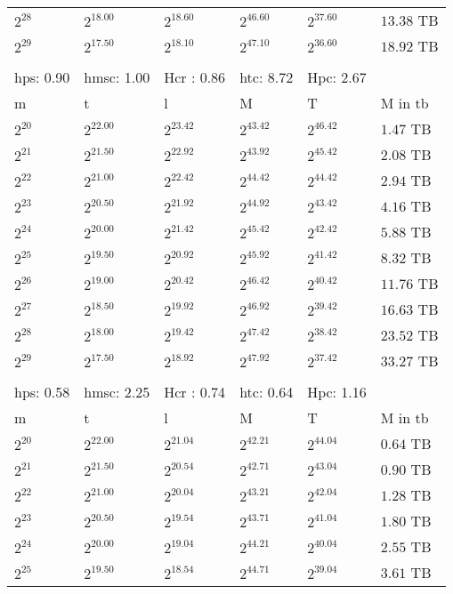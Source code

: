 \begin{tabular}{llllll}
$2^{28}$ & $2^{18.00}$ & $2^{18.60}$ & $2^{46.60}$ & $2^{37.60}$ & $13.38$ TB \\
$2^{29}$ & $2^{17.50}$ & $2^{18.10}$ & $2^{47.10}$ & $2^{36.60}$ & $18.92$ TB \\
 &  &  &  &  &  \\
hps: 0.90 & hmsc: 1.00 & Hcr : 0.86 & htc: 8.72 & Hpc: 2.67 &  \\
m & t & l & M & T & M in tb \\
$2^{20}$ & $2^{22.00}$ & $2^{23.42}$ & $2^{43.42}$ & $2^{46.42}$ & $1.47$ TB \\
$2^{21}$ & $2^{21.50}$ & $2^{22.92}$ & $2^{43.92}$ & $2^{45.42}$ & $2.08$ TB \\
$2^{22}$ & $2^{21.00}$ & $2^{22.42}$ & $2^{44.42}$ & $2^{44.42}$ & $2.94$ TB \\
$2^{23}$ & $2^{20.50}$ & $2^{21.92}$ & $2^{44.92}$ & $2^{43.42}$ & $4.16$ TB \\
$2^{24}$ & $2^{20.00}$ & $2^{21.42}$ & $2^{45.42}$ & $2^{42.42}$ & $5.88$ TB \\
$2^{25}$ & $2^{19.50}$ & $2^{20.92}$ & $2^{45.92}$ & $2^{41.42}$ & $8.32$ TB \\
$2^{26}$ & $2^{19.00}$ & $2^{20.42}$ & $2^{46.42}$ & $2^{40.42}$ & $11.76$ TB \\
$2^{27}$ & $2^{18.50}$ & $2^{19.92}$ & $2^{46.92}$ & $2^{39.42}$ & $16.63$ TB \\
$2^{28}$ & $2^{18.00}$ & $2^{19.42}$ & $2^{47.42}$ & $2^{38.42}$ & $23.52$ TB \\
$2^{29}$ & $2^{17.50}$ & $2^{18.92}$ & $2^{47.92}$ & $2^{37.42}$ & $33.27$ TB \\
 &  &  &  &  &  \\
hps: 0.58 & hmsc: 2.25 & Hcr : 0.74 & htc: 0.64 & Hpc: 1.16 &  \\
m & t & l & M & T & M in tb \\
$2^{20}$ & $2^{22.00}$ & $2^{21.04}$ & $2^{42.21}$ & $2^{44.04}$ & $0.64$ TB \\
$2^{21}$ & $2^{21.50}$ & $2^{20.54}$ & $2^{42.71}$ & $2^{43.04}$ & $0.90$ TB \\
$2^{22}$ & $2^{21.00}$ & $2^{20.04}$ & $2^{43.21}$ & $2^{42.04}$ & $1.28$ TB \\
$2^{23}$ & $2^{20.50}$ & $2^{19.54}$ & $2^{43.71}$ & $2^{41.04}$ & $1.80$ TB \\
$2^{24}$ & $2^{20.00}$ & $2^{19.04}$ & $2^{44.21}$ & $2^{40.04}$ & $2.55$ TB \\
$2^{25}$ & $2^{19.50}$ & $2^{18.54}$ & $2^{44.71}$ & $2^{39.04}$ & $3.61$ TB \\

\end{tabular}
